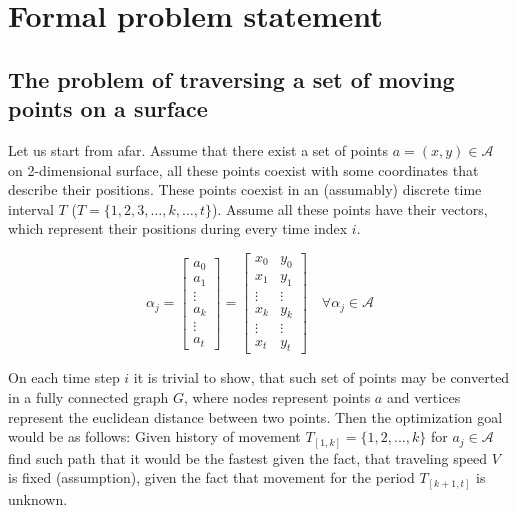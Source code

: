 \chapter{Formal problem statement}
\label{cha:Proposal-ENG}
  
 \section{The problem of traversing a set of moving points on a surface}


\iffalse %
Let us start from afar.  Assume that there exist a set of points $a=(x,y) \in\mathcal{A}$ on 2-dimensional surface, all these points coexist with some coordinates that describe their positions. 
These points coexist in an (assumably) discrete time interval 
$T$ ($T=\{1,2,3,\dots,k,\dots,t \}$). 
Assume all these points have their vectors, which represent their positions during every time index $i$. 

$$
\alpha_{j} = \begin{bmatrix}
a_{0} \\
a_{1} \\
\vdots \\
a_{k} \\
\vdots \\
a_{t}
\end{bmatrix} = \begin{bmatrix}
x_{0}  & y_{0} \\
x_{1}  & y_{1} \\
\vdots & \vdots\\
x_{k}  & y_{k} \\
\vdots & \vdots\\
x_{t}  & y_{t}
\end{bmatrix} \quad \forall \alpha_j \in \mathcal{A}
$$

On each time step $i$ it is trivial to show, that such set of points may be converted in a fully connected graph $G$, where nodes represent points $a$ and vertices represent the euclidean distance between two points. Then the optimization goal would be as follows: Given history of movement $T_{[1,k]} = \{1,2,...,k\}$ for $a_j \in \mathcal{A}$ find such path that it would be the fastest given the fact, that traveling speed $V$ is fixed (assumption), given the fact that movement for the period $T_{[k+1, t]}$ is unknown.

